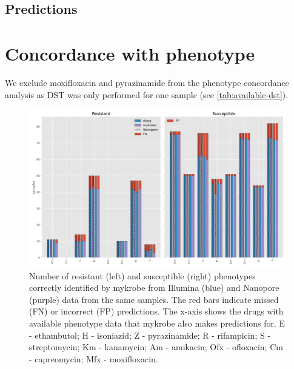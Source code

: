 \subsection{Predictions}
\label{sec:drprg-predict}

\section{Concordance with phenotype}

We exclude moxifloxacin and pyrazinamide from the phenotype concordance analysis as DST was only performed for one sample (see \autoref{tab:available-dst}).

\begin{figure}
\begin{center}
\includegraphics[width=0.90\columnwidth]{Chapter3/Figs/phenotype_concordance.png}
\caption{{Number of resistant (left) and susceptible (right) phenotypes correctly identified by mykrobe from Illumina (blue) and Nanopore (purple) data from the same samples. The red bars indicate missed (FN) or incorrect (FP) predictions. The x-axis shows the drugs with available phenotype data that mykrobe also makes predictions for. E - ethambutol; H - isoniazid; Z - pyrazinamide; R - rifampicin; S - streptomycin; Km - kanamycin; Am - amikacin; Ofx - ofloxacin; Cm - capreomycin; Mfx - moxifloxacin.
{\label{fig:pheno-concordance}}
}}
\end{center}
\end{figure}

